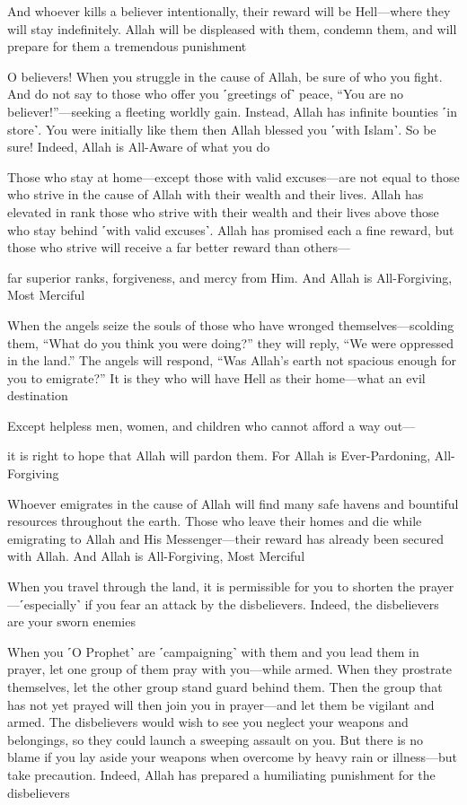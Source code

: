 And whoever kills a believer intentionally, their reward will be Hell—where they will stay indefinitely. Allah will be displeased with them, condemn them, and will prepare for them a tremendous punishment

O believers! When you struggle in the cause of Allah, be sure of who you fight. And do not say to those who offer you ˹greetings of˺ peace, “You are no believer!”—seeking a fleeting worldly gain. Instead, Allah has infinite bounties ˹in store˺. You were initially like them then Allah blessed you ˹with Islam˺. So be sure! Indeed, Allah is All-Aware of what you do

Those who stay at home—except those with valid excuses—are not equal to those who strive in the cause of Allah with their wealth and their lives. Allah has elevated in rank those who strive with their wealth and their lives above those who stay behind ˹with valid excuses˺. Allah has promised each a fine reward, but those who strive will receive a far better reward than others—

far superior ranks, forgiveness, and mercy from Him. And Allah is All-Forgiving, Most Merciful

When the angels seize the souls of those who have wronged themselves—scolding them, “What do you think you were doing?” they will reply, “We were oppressed in the land.” The angels will respond, “Was Allah’s earth not spacious enough for you to emigrate?” It is they who will have Hell as their home—what an evil destination

Except helpless men, women, and children who cannot afford a way out—

it is right to hope that Allah will pardon them. For Allah is Ever-Pardoning, All-Forgiving

Whoever emigrates in the cause of Allah will find many safe havens and bountiful resources throughout the earth. Those who leave their homes and die while emigrating to Allah and His Messenger—their reward has already been secured with Allah. And Allah is All-Forgiving, Most Merciful

When you travel through the land, it is permissible for you to shorten the prayer—˹especially˺ if you fear an attack by the disbelievers. Indeed, the disbelievers are your sworn enemies

When you ˹O Prophet˺ are ˹campaigning˺ with them and you lead them in prayer, let one group of them pray with you—while armed. When they prostrate themselves, let the other group stand guard behind them. Then the group that has not yet prayed will then join you in prayer—and let them be vigilant and armed. The disbelievers would wish to see you neglect your weapons and belongings, so they could launch a sweeping assault on you. But there is no blame if you lay aside your weapons when overcome by heavy rain or illness—but take precaution. Indeed, Allah has prepared a humiliating punishment for the disbelievers

